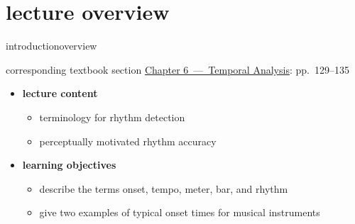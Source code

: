 




\subtitle{Module 6.0: Introduction to Tempo \& Rhythm Terminology}


	

    \section[overview]{lecture overview}
        \begin{frame}{introduction}{overview}
            \begin{block}{corresponding textbook section}
                    \href{http://ieeexplore.ieee.org/xpl/articleDetails.jsp?arnumber=6331122}{Chapter 6~---~Temporal Analysis}: pp.~129--135
            \end{block}

            \begin{itemize}
                \item   \textbf{lecture content}
                    \begin{itemize}
                        \item   terminology for rhythm detection
                        \item   perceptually motivated rhythm accuracy
                    \end{itemize}
                \bigskip
                \item<2->   \textbf{learning objectives}
                    \begin{itemize}
                        \item   describe the terms onset, tempo, meter, bar, and rhythm
                        \item   give two examples of typical onset times for musical instruments
                    \end{itemize}
            \end{itemize}
        \end{frame}

